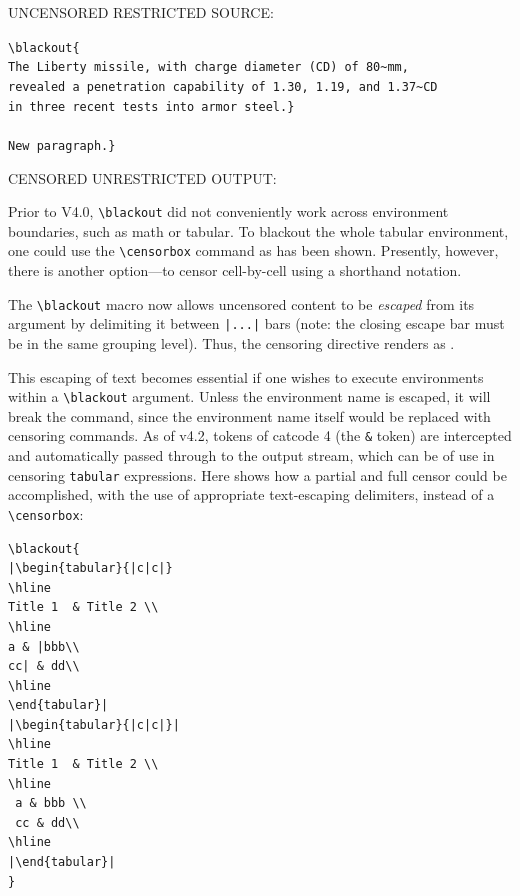 \documentclass{article}
\begin{document}
{\addtolength{\leftskip}{2.3em}
UNCENSORED RESTRICTED SOURCE: \hrulefill


\verb|\blackout{|\\
\verb|The Liberty missile, with charge diameter (CD) of 80~mm,|\\
\verb|revealed a penetration capability of 1.30, 1.19, and 1.37~CD|\\
\verb|in three recent tests into armor steel.}|\\
\verb| |\\
\verb|New paragraph.}|

CENSORED UNRESTRICTED OUTPUT: \hrulefill


\hrulefill

}

Prior to V4.0, \verb|\blackout| did not conveniently work across 
  environment boundaries, such as math or tabular.  
To blackout the whole tabular environment, one could use
  the \verb|\censorbox| command as has been shown.
Presently, however, there is another option---to censor 
  cell-by-cell using a shorthand notation.

The \verb|\blackout| macro now allows uncensored content to be \textit{escaped}
  from its argument by delimiting it between \verb+|...|+ bars (note: the
  closing escape bar must be in the same grouping level).
Thus, the censoring directive {\ttfamily\detokenize
  {}}
  renders as .

This escaping of text becomes essential if one wishes to execute
  environments within a \verb|\blackout| argument.  
Unless the environment name is escaped, it will break the command,
  since the environment name itself would be replaced with censoring
  commands.
As of v4.2, tokens of catcode 4 (the \verb|&| token) are intercepted
  and automatically passed through to the output stream, which can 
  be of use in censoring \verb|tabular| expressions.
Here shows how a partial and full censor could be accomplished, with
  the use of appropriate text-escaping delimiters, instead of a
  \verb|\censorbox|:
  
\begingroup
\begin{verbatim}
\blackout{
|\begin{tabular}{|c|c|}
\hline
Title 1  & Title 2 \\
\hline
a & |bbb\\
cc| & dd\\
\hline
\end{tabular}|
|\begin{tabular}{|c|c|}|
\hline
Title 1  & Title 2 \\
\hline
 a & bbb \\
 cc & dd\\
\hline
|\end{tabular}|
}
\end{verbatim}
\end{document}
